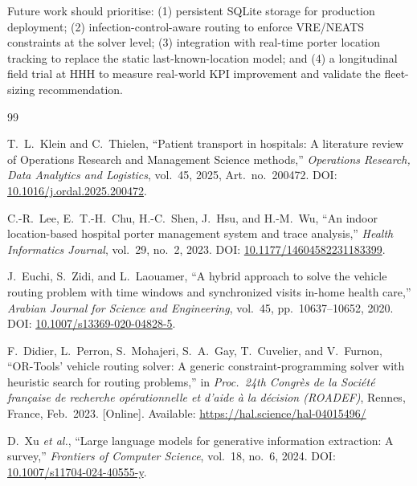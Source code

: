 \documentclass[12pt,a4paper]{article}
\begin{document}
Future work should prioritise: (1) persistent SQLite storage for production deployment; (2) infection-control-aware routing to enforce VRE/NEATS constraints at the solver level; (3) integration with real-time porter location tracking to replace the static last-known-location model; and (4) a longitudinal field trial at HHH to measure real-world KPI improvement and validate the fleet-sizing recommendation.

\newpage

\begin{thebibliography}{99}

T.~L.~Klein and C.~Thielen,
``Patient transport in hospitals: A literature review of Operations Research and Management Science methods,''
\textit{Operations Research, Data Analytics and Logistics},
vol.~45, 2025, Art.~no.~200472.
DOI: \href{https://doi.org/10.1016/j.ordal.2025.200472}{10.1016/j.ordal.2025.200472}.

C.-R.~Lee, E.~T.-H.~Chu, H.-C.~Shen, J.~Hsu, and H.-M.~Wu,
``An indoor location-based hospital porter management system and trace analysis,''
\textit{Health Informatics Journal},
vol.~29, no.~2, 2023.
DOI: \href{https://doi.org/10.1177/14604582231183399}{10.1177/14604582231183399}.

J.~Euchi, S.~Zidi, and L.~Laouamer,
``A hybrid approach to solve the vehicle routing problem with time windows and synchronized visits in-home health care,''
\textit{Arabian Journal for Science and Engineering},
vol.~45, pp.~10637--10652, 2020.
DOI: \href{https://doi.org/10.1007/s13369-020-04828-5}{10.1007/s13369-020-04828-5}.

F.~Didier, L.~Perron, S.~Mohajeri, S.~A.~Gay, T.~Cuvelier, and V.~Furnon,
``OR-Tools' vehicle routing solver: A generic constraint-programming solver with heuristic search for routing problems,''
in \textit{Proc.\ 24th Congr\`es de la Soci\'et\'e fran\c{c}aise de recherche op\'erationnelle et d'aide \`a la d\'ecision (ROADEF)},
Rennes, France, Feb.~2023.
[Online]. Available: \url{https://hal.science/hal-04015496/}

D.~Xu \textit{et al.},
``Large language models for generative information extraction: A survey,''
\textit{Frontiers of Computer Science},
vol.~18, no.~6, 2024.
DOI: \href{https://doi.org/10.1007/s11704-024-40555-y}{10.1007/s11704-024-40555-y}.


\end{thebibliography}
\end{document}
